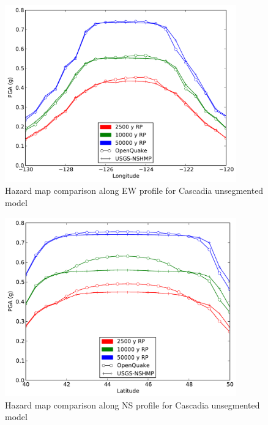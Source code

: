 \begin{figure}
\centering
\includegraphics[width=10cm]{./qareport/pictures/cascadia_float_oq_nshmp_ew.pdf}
\caption{Hazard map comparison along EW profile for Cascadia unsegmented model}
\label{fig:cascadia_float_ew}
\end{figure}
\begin{figure}
\centering
\includegraphics[width=10cm]{./qareport/pictures/cascadia_float_oq_nshmp_ns.pdf}
\caption{Hazard map comparison along NS profile for Cascadia unsegmented model}
\label{fig:cascadia_float_ns}
\end{figure}
